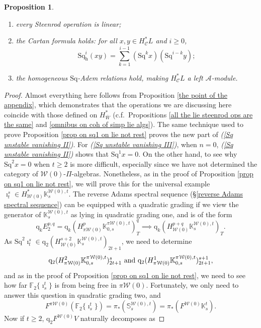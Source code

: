 \documentclass[11pt]{amsart} \renewcommand{\baselinestretch}{1.2}
\theoremstyle{plain}
\newtheorem{prop}[thm]{Proposition}
\numberwithin{equation}{section} %
\theoremstyle{plain}
\newtheorem{prop}[thm]{Proposition}
\numberwithin{equation}{chapter} %
\newcommand{\calA}{\mathcal{A}}
\newcommand{\calw}{\mathcal{W}}
\newcommand{\calc}{\mathcal{C}}
\newcommand{\PA}[1]{\pi#1}
\newcommand{\quadgrad}[1]{\mathrm{q}_{#1}}
\newcommand{\Sq}{\mathrm{Sq}}
\newcommand{\LieSteen}{\calA}
\newcommand{\F}{\mathbb{F}}
\newcommand{\Ftwo}{\F_2}
\newcommand{\dhor}{_\mathrm{h}}
\newcommand{\Sqh}{\mathrm{Sq}\dhor}
\begin{document}
\begin{Cohomology Operations for W and U}
\begin{prop}
\begin{enumerate}
\item every Steenrod operation is linear;
\item the \emph{Cartan formula} holds:  for all $x,y\in   H^*_{\calc}L$ and $i\geq0$,
\[\Sqh^i(xy)=\textstyle\sum_{k=1}^{i-1}(\Sq^kx)(\Sq^{i-k}y);\]
\item \label{yeah H is a Stmodule II} the  homogeneous $\Sq$-Adem relations hold, making $H^{*}_\calc L$ a left $\LieSteen$-module.
\end{enumerate}
\end{prop}
\begin{proof}
Almost everything here follows from Proposition \ref{the point of the appendix}, which demonstrates that the operations we are discussing here coincide with those defined on $H^*_{\bar{W}}$ (c.f.\ Propositions \ref{all the lie steenrod ops are the same} and \ref{omnibus on coh of simp lie algs}). The same technique used to prove Proposition \ref{prop on sq1 on lie not rest} proves the new part of \emph{(\ref{Sq unstable vanishing II})}. For \emph{(\ref{Sq unstable vanishing III})},  when $n=0$, \emph{(\ref{Sq unstable vanishing II})} shows that $\Sq^1x=0$. On the other hand, to see why $\Sq^2x=0$ when $t\geq2$ is more difficult, especially since we have not determined the category of $\calw(0)$-$\Pi$-algebras. Nonetheless, as in the proof of Proposition \ref{prop on sq1 on lie not rest}, we will prove this for the universal example $\imath^s_t\in H^*_{\calw(0)}\mathbb{K}_s^{\calw(0),t}$. The reverse Adams spectral sequence (\S\ref{reverse Adams spectral sequence}) can be equipped with a quadratic grading if we view the generator of $\mathbb{K}_s^{\calw(0),t}$ as lying in quadratic grading one, and is of the form
\[\quadgrad{k}E_2^{p,q}=\quadgrad{k}(H^{p}_{\PA{\calw(0)}}\mathbb{K}_{0,s}^{\PA{\calw(0)},t})^{q}_{T}\implies \quadgrad{k}(H^{p+q}_{\calw(0)}\mathbb{K}_s^{\calw(0),t})_T.\]
As $\Sq^2\imath_t^s\in \quadgrad{2}(H^{s+2}_{\calw(0)}\mathbb{K}_s^{\calw(0),t})_{2t+1}$, we need to determine
\[
\quadgrad{2}(H^{2}_{\PA{\calw(0)}}\mathbb{K}_{0,s}^{\PA{\calw(0)},t})^{s}_{2t+1}\textup{ and }
\quadgrad{2}(H^{1}_{\PA{\calw(0)}}\mathbb{K}_{0,s}^{\PA{\calw(0)},t})^{s+1}_{2t+1},
\] 
and as in the proof of Proposition \ref{prop on sq1 on lie not rest}, we need to see how far $\Ftwo\{\imath^t_s\}$ is from being free in $\PA{\calw(0)}$. Fortunately, we only need to answer this question in quadratic grading two, and 
\[F^{\PA{\calw(0)}}(\Ftwo\{\imath^t_s\})=\pi_*(\mathbb{S}_s^{\calw(0),t})=\pi_*(F^{\calw(0)} \mathbb{K}^{t}_s).\]
Now if $t\geq2$, $\quadgrad{2}F^{\calw(0)}V$ naturally decomposes as 

\end{proof}
\end{Cohomology Operations for W and U}
\end{document}
